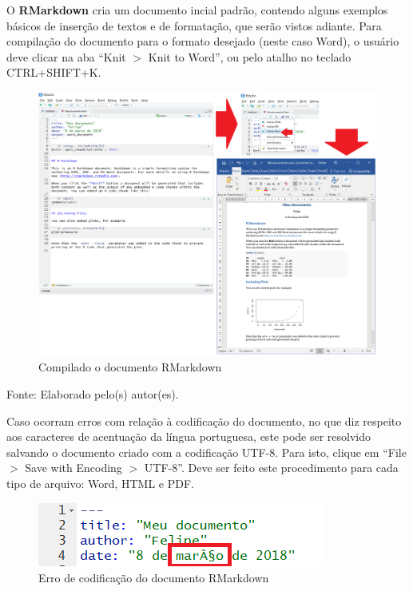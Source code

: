 \documentclass[12pt,brazil,oneside]{book}
\begin{document}
O \textbf{RMarkdown} cria um documento incial padrão, contendo alguns exemplos básicos de inserção de textos e de formatação, que serão vistos adiante. Para compilação do documento para o formato desejado (neste caso Word), o usuário deve clicar na aba ``Knit \(>\) Knit to Word'', ou pelo atalho no teclado CTRL+SHIFT+K.

\begin{figure}[H]

{\centering \includegraphics[width=0.8\linewidth]{compilar} 

}

\caption{Compilado o documento RMarkdown}\label{fig:compil}
\end{figure}

Fonte: Elaborado pelo(s) autor(es).

Caso ocorram erros com relação à codificação do documento, no que diz respeito aos caracteres de acentuação da língua portuguesa, este pode ser resolvido salvando o documento criado com a codificação UTF-8. Para isto, clique em ``File \(>\) Save with Encoding \(>\) UTF-8''. Deve ser feito este procedimento para cada tipo de arquivo: Word, HTML e PDF.

\begin{figure}[H]

{\centering \includegraphics[width=0.8\linewidth]{errocodif} 

}

\caption{Erro de codificação do documento RMarkdown}\label{fig:errocodif}
\end{figure}
\end{document}
